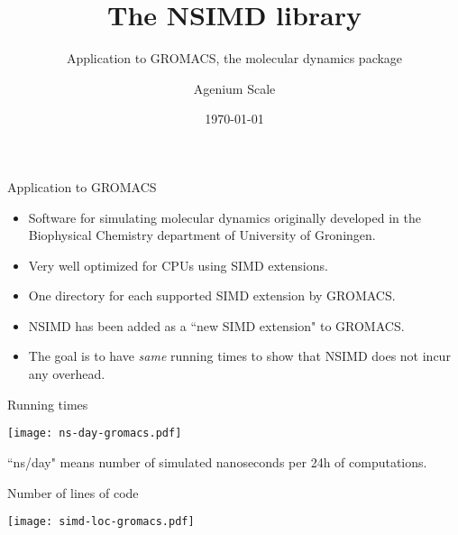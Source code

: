 \documentclass[shrink, compress, mathserif, 10pt, xcolor=dvipsnames,
               aspectratio=169]{beamer}
\title{The NSIMD library}
\subtitle{Application to GROMACS, the  molecular dynamics package}
\date{\today}
\author{Agenium Scale}
\begin{document}
\begin{frame}[plain]
  \maketitle
\end{frame}



\begin{frame}{Application to GROMACS}
  \begin{itemize}
    \item
      Software for simulating molecular dynamics originally developed in the
      Biophysical Chemistry department of University of Groningen.
    \vspace{1em}
    \item
      Very well optimized for CPUs using SIMD extensions.
    \vspace{1em}
    \item
      One directory for each supported SIMD extension by GROMACS.
    \vspace{1em}
    \item
      NSIMD has been added as a ``new SIMD extension" to GROMACS.
    \vspace{1em}
    \item
      The goal is to have \emph{same} running times to show that NSIMD does
      not incur any overhead.
  \end{itemize}
\end{frame}

\begin{frame}{Running times}
  \begin{center}
    \texttt{[image: ns-day-gromacs.pdf]}
  \end{center}

  ``ns/day" means number of simulated nanoseconds per 24h of computations.
\end{frame}

\begin{frame}{Number of lines of code}
  \begin{center}
    \texttt{[image: simd-loc-gromacs.pdf]}
  \end{center}
\end{frame}
\end{document}
